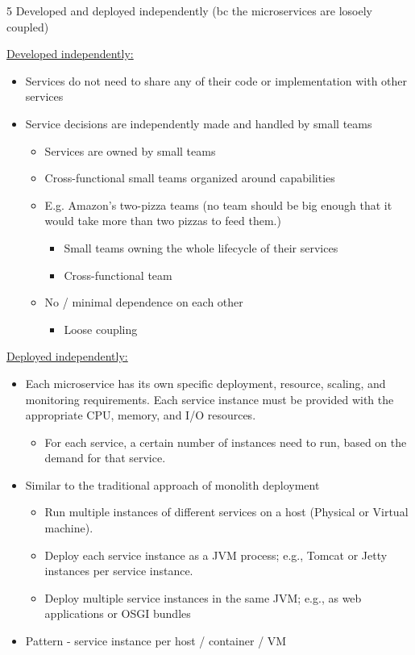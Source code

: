 \documentclass[landscape,a4paper]{extarticle}
\begin{document}
\begin{multicols*}{5}
    Developed and deployed independently (bc the microservices are losoely coupled)

    \uline{Developed independently:}

    \begin{itemize}
        \item Services do not need to share any of their code or implementation with other services
        \item Service decisions are independently made and handled by small teams 
        \begin{itemize}
            \item Services are owned by small teams
            \item Cross-functional small teams organized around capabilities
            \item E.g. Amazon's two-pizza teams (no team should be big enough that it would take more than two pizzas to feed them.)
            \begin{itemize}
                \item Small teams owning the whole lifecycle of their services
                \item Cross-functional team
            \end{itemize}
            \item No / minimal dependence on each other
            \begin{itemize}
                \item Loose coupling
            \end{itemize}
        \end{itemize}
    \end{itemize}

    \uline{Deployed independently:}

    \begin{itemize}
        \item Each microservice has its own specific deployment, resource, scaling,
        and monitoring requirements. Each service instance must be provided with
        the appropriate CPU, memory, and I/O resources.
        \begin{itemize}
            \item For each service, a certain number of instances need to run, based on the demand for that service.
        \end{itemize}
        \item Similar to the traditional approach of monolith deployment
        \begin{itemize}
            \item Run multiple instances of different services on a host (Physical or Virtual machine).
            \item Deploy each service instance as a JVM process; e.g., Tomcat or Jetty instances per service instance.
            \item Deploy multiple service instances in the same JVM; e.g., as web applications or OSGI bundles
        \end{itemize}
        \item Pattern - service instance per host / container / VM
    \end{itemize}


\end{multicols*}
\end{document}
